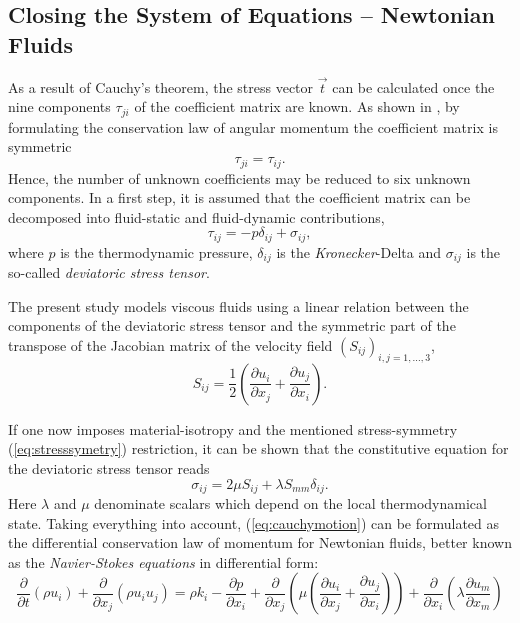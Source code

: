 \subsection{Closing the System of Equations -- Newtonian Fluids}
\label{sec:fundclosing}

As a result of Cauchy's theorem, the stress vector \( \vec{t} \) can be calculated once the nine components \(\tau_{ji}\) of the coefficient matrix are known. As shown in \cite{kundu12,spurk10}, by formulating the conservation law of angular momentum the coefficient matrix is symmetric
\begin{equation}
  \label{eq:stresssymetry}
  \tau_{ji} = \tau_{ij}.
\end{equation}
Hence, the number of unknown coefficients may be reduced to six unknown components. In a first step, it is assumed that the coefficient matrix can be decomposed into fluid-static and fluid-dynamic contributions,
\begin{displaymath}
  \tau_{ij} = -p \delta_{ij} + \sigma_{ij},
\end{displaymath}
where \(p\) is the thermodynamic pressure, \(\delta_{ij}\) is the \emph{Kronecker}-Delta and \( \sigma_{ij} \) is the so-called \emph{deviatoric stress tensor}. 
    
The present study models viscous fluids using a linear relation between the components of the deviatoric stress tensor and the symmetric part of the transpose of the Jacobian matrix of the velocity field \(\left( S_{ij} \right)_{i,j=1,\dots,3}\),
\begin{displaymath}
  S_{ij} = \frac{1}{2} \left( \frac{\partial u_i}{\partial x_j} + \frac{\partial u_j}{\partial x_i} \right).
\end{displaymath}

If one now imposes material-isotropy and the mentioned stress-symmetry (\ref{eq:stresssymetry}) restriction, it can be shown \cite{aris62} that the constitutive equation for the deviatoric stress tensor reads 
\begin{displaymath}
  \sigma_{ij} = 2 \mu S_{ij} + \lambda S_{mm} \delta_{ij}.
\end{displaymath}
Here \(\lambda\) and \(\mu\) denominate scalars which depend on the local thermodynamical state. Taking everything into account, (\ref{eq:cauchymotion}) can be formulated as the differential conservation law of momentum for Newtonian fluids, better known as the \emph{Navier-Stokes equations} in differential form:
\begin{equation}
\label{eq:nsfull}
\frac{\partial }{\partial t} \left(\rho u_i \right)
+ \frac{\partial}{\partial x_j} \left( \rho u_i  u_j \right) 
= \rho k_i
- \frac{\partial p}{\partial x_i}
+ \frac{\partial}{\partial x_j} \left( \mu  \left( \frac{\partial u_i}{\partial x_j} 
                                        + \frac{\partial u_j}{\partial x_i} \right) \right)
+ \frac{\partial}{\partial x_i} \left(\lambda \frac{\partial u_m}{\partial x_m} \right)
\end{equation}

